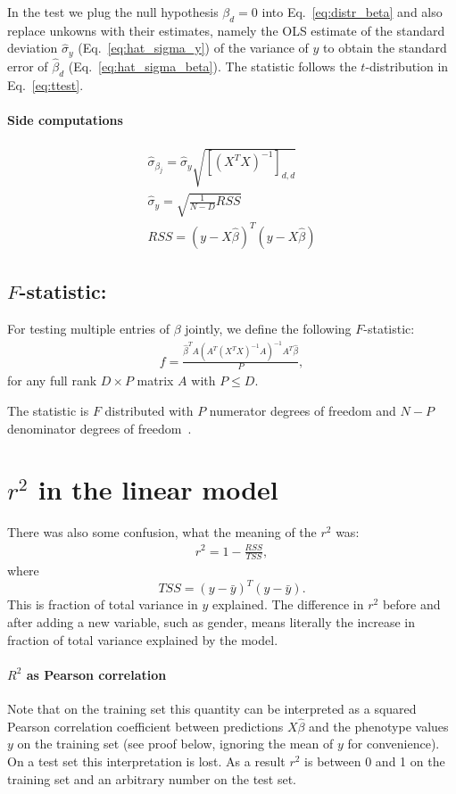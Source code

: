 \documentclass{scrartcl}
\begin{document}
In the test we plug the null hypothesis $\beta_d=0$ into Eq.~\eqref{eq:distr_beta} and also replace unkowns with their estimates, namely  the OLS estimate of the standard deviation $\hat\sigma_y$ (Eq.~\eqref{eq:hat_sigma_y}) of the variance of $y$ to obtain the standard error of $\hat\beta_d$ (Eq.~\eqref{eq:hat_sigma_beta}).
The statistic follows the $t$-distribution in Eq.~\eqref{eq:ttest}.
\paragraph{Side computations}
\begin{align}
\label{eq:hat_sigma_beta}
\hat\sigma_{\beta_j}=\hat\sigma_y\sqrt{\left[(X^TX)^{-1}\right]_{d,d}}
\\
\label{eq:hat_sigma_y}
\hat\sigma_y = \sqrt{\frac{1}{N-D}RSS}
\\\nonumber
RSS=(y-X\hat\beta)^T(y-X\hat\beta)
\end{align}


\subsection{\bf $F$-statistic:}
For testing multiple entries of $\beta$ jointly, we define the following $F$-statistic:
\begin{align}
f = \frac{\hat\beta^T A \left(A^T\left( X^T X \right)^{-1}A\right)^{-1} A^T \hat\beta}
{P}
,
\end{align}
for any full rank $D\times P$ matrix $A$ with $P\leq D$.

The statistic is $F$ distributed with $P$ numerator degrees of freedom and $N-P$  denominator degrees of freedom~\citep{kang2008efficient}.

\section{$r^2$ in the linear model}
There was also some confusion, what the meaning of the $r^2$ was:
\begin{align}
r^2 = 1-\frac{RSS}{TSS},
\end{align}
where $$TSS = (y-\bar y)^T(y-\bar y).$$
This is fraction of total variance in $y$ explained. The difference in $r^2$ before and after adding a new variable, such as gender, means literally the increase in fraction of total variance explained by the model.

\paragraph{$R^2$ as Pearson correlation}
Note that on the training set this quantity can be interpreted as a squared Pearson correlation coefficient between predictions $X\hat\beta$ and the phenotype values $y$ on the training set (see proof below, ignoring the mean of $y$ for convenience). On a test set this interpretation is lost. As a result $r^2$ is between 0 and 1 on the training set and an arbitrary number on the test set.
\end{document}

